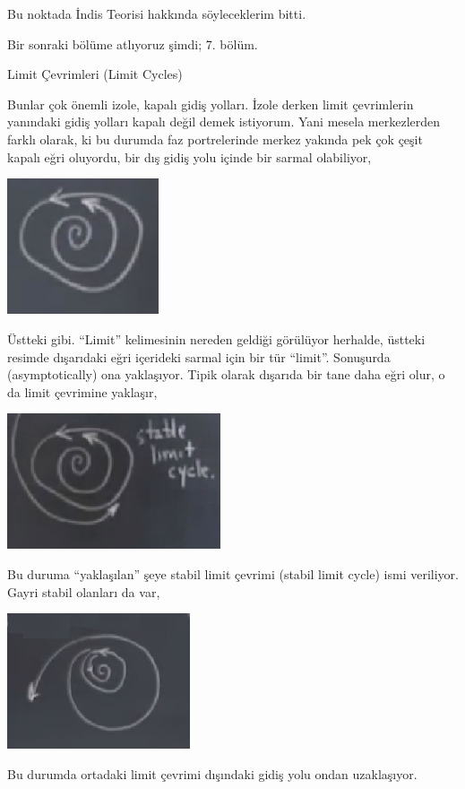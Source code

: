 \documentclass[12pt,fleqn]{article}\usepackage{../../common}
\begin{document}
Bu noktada İndis Teorisi hakkında söyleceklerim bitti. 

Bir sonraki bölüme atlıyoruz şimdi; 7. bölüm.

Limit Çevrimleri (Limit Cycles)

Bunlar çok önemli izole, kapalı gidiş yolları. İzole derken limit çevrimlerin
yanındaki gidiş yolları kapalı değil demek istiyorum. Yani mesela merkezlerden
farklı olarak, ki bu durumda faz portrelerinde merkez yakında pek çok çeşit
kapalı eğri oluyordu, bir dış gidiş yolu içinde bir sarmal olabiliyor,

\includegraphics[height=4cm]{08_36.png}

Üstteki gibi. ``Limit'' kelimesinin nereden geldiği görülüyor herhalde, üstteki
resimde dışarıdaki eğri içerideki sarmal için bir tür ``limit''. Sonuşurda
(asymptotically) ona yaklaşıyor. Tipik olarak dışarıda bir tane daha eğri olur,
o da limit çevrimine yaklaşır,

\includegraphics[height=4cm]{08_37.png}

Bu duruma ``yaklaşılan'' şeye stabil limit çevrimi (stabil limit cycle) ismi
veriliyor. Gayri stabil olanları da var,  

\includegraphics[height=4cm]{08_38.png}

Bu durumda ortadaki limit çevrimi dışındaki gidiş yolu ondan uzaklaşıyor.
\end{document}

